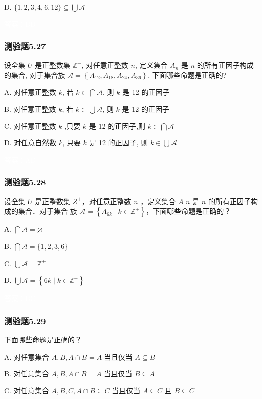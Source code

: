 \documentclass[UTF8, heading=true]{ctexart}
\begin{document}
D. $\{1,2,3,4,6,12\} \subseteq \bigcup \mathcal{A}$

\textcolor{white}{答案：BD}

\subsubsection{测验题5.27}

设全集 $U$ 是正整数集 $\mathbb{Z}^{+}$, 对任意正整数 $n$, 定义集合 $A_n$ 是 $n$ 的所有正因子构成的集合, 对于集合族 $\mathcal{A}=\left\{A_{12}, A_{18}, A_{24}, A_{36}\right\}$, 下面哪些命题是正确的?

A. 对任意正整数 $k$, 若 $k \in \bigcap \mathcal{A}$, 则 $k$ 是 12 的正因子

B. 对任意正整数 $k$, 若 $k \in \bigcup \mathcal{A}$, 则 $k$ 是 12 的正因子

C. 对任意正整数 $k$ ,只要 $k$ 是 12 的正因子,则 $k \in \bigcap \mathcal{A}$

D. 对任意自然数 $k$, 只要 $k$ 是 12 的正因子, 则 $k \in \bigcup \mathcal{A}$

\textcolor{white}{答案：AD}

\subsubsection{测验题5.28}

设全集 $U$ 是正整数集 $Z^{+}$，对任意正整数 $n$ ，定义集合 $A$ $n$ 是 $n$ 的所有正因子构成的集合．对于集合
族 $\mathcal{A}=\left\{A_{6 k} \mid k \in \mathbb{Z}^{+}\right\}$，下面哪些命题是正确的？

А. $\bigcap \mathcal{A}=\varnothing$

B. $\bigcap \mathcal{A}=\{1,2,3,6\}$

C. $\bigcup \mathcal{A}=\mathbb{Z}^{+}$

D. $\bigcup \mathcal{A}=\left\{6 k \mid k \in \mathbb{Z}^{+}\right\}$

\textcolor{white}{答案：BC}



\subsubsection{测验题5.29}
下面哪些命题是正确的？

A. 对任意集合 $A, B, A \cap B=A$ 当且仅当 $A \subseteq B$

B. 对任意集合 $A, B, A \cap B=A$ 当且仅当 $B \subseteq A$

C. 对任意集合 $A, B, C, A \cap B \subseteq C$ 当且仅当 $A \subseteq C$ 且 $B \subseteq C$
\end{document}
